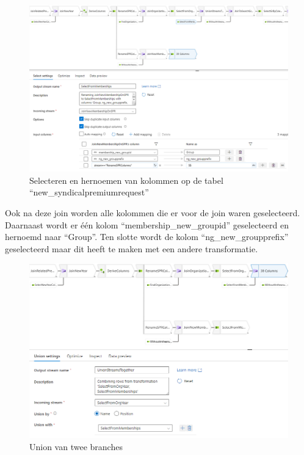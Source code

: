 \begin{figure}[H]
    \centering
    \includegraphics[width=1\textwidth]{./graphics/adf/bepalen_groep_8.png}
    \caption{Selecteren en hernoemen van kolommen op de tabel ``new\_syndicalpremiumrequest''}
    \label{fig:bepalengroep}
\end{figure}

Ook na deze join worden alle kolommen die er voor de join waren geselecteerd. Daarnaast wordt er één kolom ``membership\_new\_groupid'' geselecteerd en hernoemd naar ``Group''. Ten slotte wordt de kolom ``ng\_new\_groupprefix'' geselecteerd maar dit heeft te maken met een andere transformatie.

\begin{figure}[H]
    \centering
    \includegraphics[width=1\textwidth]{./graphics/adf/bepalen_groep_9.png}
    \caption{Union van twee branches}
\end{figure}

